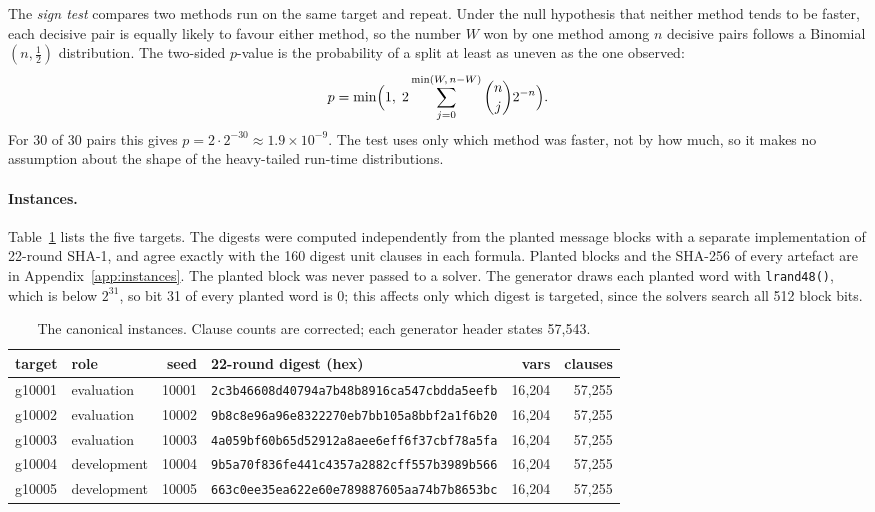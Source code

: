 \documentclass[11pt,a4paper]{article}
\begin{document}
The \emph{sign test} compares two methods run on the same target and repeat. Under the null
hypothesis that neither method tends to be faster, each decisive pair is equally likely to favour
either method, so the number $W$ won by one method among $n$ decisive pairs follows a Binomial
$(n,\tfrac12)$ distribution. The two-sided $p$-value is the probability of a split at least as
uneven as the one observed:
\[
p=\min\Bigl(1,\;2\sum_{j=0}^{\min(W,\,n-W)}\binom{n}{j}2^{-n}\Bigr).
\]
For 30 of 30 pairs this gives $p=2\cdot2^{-30}\approx1.9\times10^{-9}$. The test uses only which
method was faster, not by how much, so it makes no assumption about the shape of the heavy-tailed
run-time distributions.

\paragraph{Instances.} Table~\ref{tab:inst} lists the five targets. The digests were computed
independently from the planted message blocks with a separate implementation of 22-round SHA-1, and
agree exactly with the 160 digest unit clauses in each formula. Planted blocks and the SHA-256 of
every artefact are in Appendix~\ref{app:instances}. The planted block was never passed to a solver. The generator draws each planted word with
\texttt{lrand48()}, which is below $2^{31}$, so bit 31 of every planted word is 0; this affects only
which digest is targeted, since the solvers search all 512 block bits.

\begin{table}[h]\centering\footnotesize\setlength{\tabcolsep}{4pt}
\begin{tabular}{@{}llrlrr@{}}
\toprule
\textbf{target} & \textbf{role} & \textbf{seed} & \textbf{22-round digest (hex)} & \textbf{vars} & \textbf{clauses}\\
\midrule
g10001 & evaluation & 10001 & \texttt{2c3b46608d40794a7b48b8916ca547cbdda5eefb} & 16{,}204 & 57{,}255\\
g10002 & evaluation & 10002 & \texttt{9b8c8e96a96e8322270eb7bb105a8bbf2a1f6b20} & 16{,}204 & 57{,}255\\
g10003 & evaluation & 10003 & \texttt{4a059bf60b65d52912a8aee6eff6f37cbf78a5fa} & 16{,}204 & 57{,}255\\
g10004 & development & 10004 & \texttt{9b5a70f836fe441c4357a2882cff557b3989b566} & 16{,}204 & 57{,}255\\
g10005 & development & 10005 & \texttt{663c0ee35ea622e60e789887605aa74b7b8653bc} & 16{,}204 & 57{,}255\\
\bottomrule
\end{tabular}
\caption{The canonical instances. Clause counts are corrected; each generator header states 57{,}543.}
\label{tab:inst}
\end{table}
\end{document}
